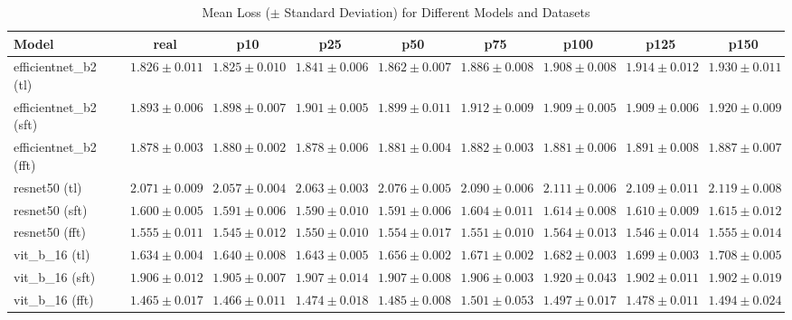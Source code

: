 \begin{table}[htbp]
    \centering
    \footnotesize %
    \caption{Mean Loss ($\pm$ Standard Deviation) for Different Models and Datasets}
    \label{tab:loss_results}
    \begin{tabular}{l *{8}{c}}
        \toprule
        \textbf{Model} & \textbf{real} & \textbf{p10} & \textbf{p25} & \textbf{p50} & \textbf{p75} & \textbf{p100} & \textbf{p125} & \textbf{p150} \\
        \midrule
        efficientnet\_b2 (tl) & $1.826 \pm 0.011$ & $1.825 \pm 0.010$ & $1.841 \pm 0.006$ & $1.862 \pm 0.007$ & $1.886 \pm 0.008$ & $1.908 \pm 0.008$ & $1.914 \pm 0.012$ & $1.930 \pm 0.011$ \\
        efficientnet\_b2 (sft) & $1.893 \pm 0.006$ & $1.898 \pm 0.007$ & $1.901 \pm 0.005$ & $1.899 \pm 0.011$ & $1.912 \pm 0.009$ & $1.909 \pm 0.005$ & $1.909 \pm 0.006$ & $1.920 \pm 0.009$ \\
        efficientnet\_b2 (fft) & $1.878 \pm 0.003$ & $1.880 \pm 0.002$ & $1.878 \pm 0.006$ & $1.881 \pm 0.004$ & $1.882 \pm 0.003$ & $1.881 \pm 0.006$ & $1.891 \pm 0.008$ & $1.887 \pm 0.007$ \\
        resnet50 (tl) & $2.071 \pm 0.009$ & $2.057 \pm 0.004$ & $2.063 \pm 0.003$ & $2.076 \pm 0.005$ & $2.090 \pm 0.006$ & $2.111 \pm 0.006$ & $2.109 \pm 0.011$ & $2.119 \pm 0.008$ \\
        resnet50 (sft) & $1.600 \pm 0.005$ & $1.591 \pm 0.006$ & $1.590 \pm 0.010$ & $1.591 \pm 0.006$ & $1.604 \pm 0.011$ & $1.614 \pm 0.008$ & $1.610 \pm 0.009$ & $1.615 \pm 0.012$ \\
        resnet50 (fft) & $1.555 \pm 0.011$ & $1.545 \pm 0.012$ & $1.550 \pm 0.010$ & $1.554 \pm 0.017$ & $1.551 \pm 0.010$ & $1.564 \pm 0.013$ & $1.546 \pm 0.014$ & $1.555 \pm 0.014$ \\
        vit\_b\_16 (tl) & $1.634 \pm 0.004$ & $1.640 \pm 0.008$ & $1.643 \pm 0.005$ & $1.656 \pm 0.002$ & $1.671 \pm 0.002$ & $1.682 \pm 0.003$ & $1.699 \pm 0.003$ & $1.708 \pm 0.005$ \\
        vit\_b\_16 (sft) & $1.906 \pm 0.012$ & $1.905 \pm 0.007$ & $1.907 \pm 0.014$ & $1.907 \pm 0.008$ & $1.906 \pm 0.003$ & $1.920 \pm 0.043$ & $1.902 \pm 0.011$ & $1.902 \pm 0.019$ \\
        vit\_b\_16 (fft) & $1.465 \pm 0.017$ & $1.466 \pm 0.011$ & $1.474 \pm 0.018$ & $1.485 \pm 0.008$ & $1.501 \pm 0.053$ & $1.497 \pm 0.017$ & $1.478 \pm 0.011$ & $1.494 \pm 0.024$ \\
        \bottomrule
    \end{tabular}
\end{table}